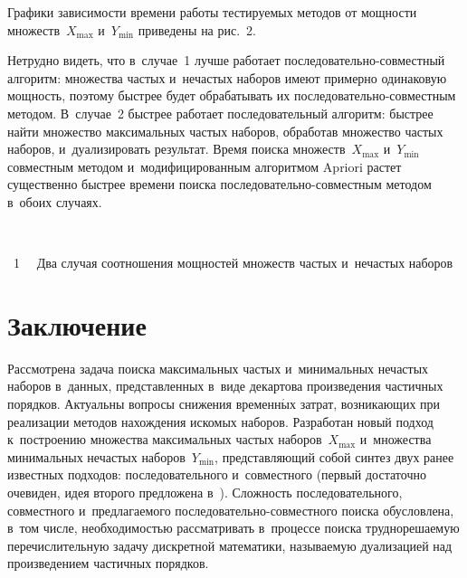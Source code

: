 \begin{multicols}{2}
    Графики зависимости времени работы тестируемых методов 
    от мощ\-ности множеств~$X_{\max}$ и~$Y_{\min}$ приведены на рис.~2.
    
    

    

    Нетрудно видеть, что в~случае~1 лучше работает по\-сле\-до\-ва\-тель\-но-со\-вмест\-ный алгоритм: 
    множества час\-тых и~не\-час\-тых наборов имеют примерно одинаковую мощ\-ность, 
    поэтому быст\-рее будет обрабатывать их по\-сле\-до\-ва\-тель\-но-со\-вмест\-ным методом. В~случае~2 
    быст\-рее работает последовательный алгоритм: быст\-рее найти множество максимальных час\-тых наборов, 
    обработав множество час\-тых наборов, и~дуализировать результат. Время поиска множеств~$X_{\max}$ 
    и~$Y_{\min}$ совместным методом и~модифицированным алгоритмом Apriori рас\-тет существенно 
    быст\-рее времени поиска по\-сле\-до\-ва\-тель\-но-со\-вмест\-ным методом в~обоих случаях.
    
    { \begin{center}  %
 \vspace*{9pt}
    \mbox{%
\epsfxsize=67.963mm
}

\end{center}

\noindent
{{\figurename~1}\ \ \small{
Два случая соотношения мощностей множеств час\-тых и~не\-час\-тых наборов
}}}



    \section{Заключение}
    
Рас\-смот\-ре\-на задача поиска максимальных час\-тых и~минимальных не\-час\-тых наборов в~данных, 
представленных в~виде декартова произведения час\-тич\-ных порядков. Актуальны вопросы 
снижения временн$\acute{\mbox{ы}}$х затрат, возникающих при реализации методов нахождения искомых наборов.
 Разработан новый подход к~по\-стро\-ению множества максимальных частых наборов~$X_{\max}$ и~множества 
 минимальных не\-час\-тых наборов~$Y_{\min}$, пред\-став\-ля\-ющий собой синтез двух ранее известных 
 подходов: последовательного и~со\-вмест\-но\-го (первый достаточно очевиден, идея второго предложена в~\cite{9}). 
 Сложность последовательного, совместного и~пред\-ла\-га\-емо\-го по\-сле\-до\-ва\-тель\-но-со\-вмест\-но\-го поиска 
 обуслов\-ле\-на, в~том чис\-ле, не\-об\-хо\-ди\-мостью рас\-смат\-ри\-вать в~процессе поиска 
 труд\-но\-ре\-ша\-емую пе\-ре\-чис\-ли\-тель\-ную задачу дис\-крет\-ной математики, на\-зы\-ва\-емую дуализацией 
 над произведением час\-тич\-ных порядков.


\end{multicols}
